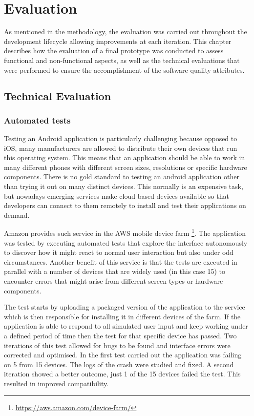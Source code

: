 \chapter{Evaluation}
As mentioned in the methodology, the evaluation was carried out throughout the development lifecycle allowing improvements at each iteration. This chapter describes how the evaluation of a final prototype was conducted to assess functional and non-functional aspects, as well as the technical evaluations that were performed to ensure the accomplishment of the software quality attributes. 

\section{Technical Evaluation}

\subsection{Automated tests}

Testing an Android application is particularly challenging because opposed to iOS, many manufacturers are allowed to distribute their own devices that run this operating system. This means that an application should be able to work in many different phones with different screen sizes, resolutions or specific hardware components. There is no gold standard to testing an android application other than trying it out on many distinct devices. This normally is an expensive task, but nowadays emerging services make cloud-based devices available so that developers can connect to them remotely to install and test their applications on demand.

Amazon provides such service in the AWS mobile device farm \footnote{\url{https://aws.amazon.com/device-farm/}}. The application was tested by executing automated tests that explore the interface autonomously to discover how it might react to normal user interaction but also under odd circumstances. Another benefit of this service is that the tests are executed in parallel with a number of devices that are widely used (in this case 15) to encounter errors that might arise from different screen types or hardware components. 

The test starts by uploading a packaged version of the application to the service which is then responsible for installing it in different devices of the farm. If the application is able to respond to all simulated user input and keep working under a defined period of time then the test for that specific device has passed. Two iterations of this test allowed for bugs to be found and interface errors were corrected and optimised. In the first test carried out the application was failing on 5 from 15 devices. The logs of the crash were studied and fixed. A second iteration showed a better outcome, just 1 of the 15 devices failed the test. This resulted in improved compatibility.   

